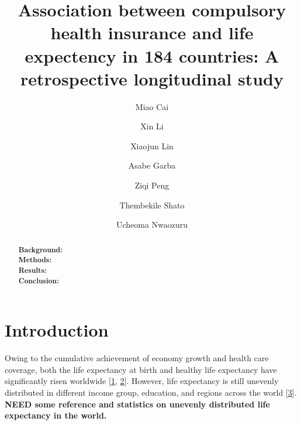 \documentclass[]{elsarticle} %
\begin{document}
\begin{frontmatter}

  \title{Association between compulsory health insurance and life expectency in 184 countries: A retrospective longitudinal study}
    \author[SLU]{Miao Cai}
  
    \author[WHU]{Xin Li}
  
    \author[SCU]{Xiaojun Lin}
    \author[SLU]{Asabe Garba}
  
    \author[SLU]{Ziqi Peng}
  
    \author[SLU]{Thembekile Shato}
  
    \author[SLU]{Ucheoma Nwaozuru}
  
      \address[SLU]{College for Public Health and Social Justice, Saint Louis University, Saint Louis, MO, 63108}
    \address[SCU]{West China School of Public Health, Sichuan University, Chengdu, Sichuan, China, 610044}
    \address[WHU]{School of Information Management, Wuhan University, Wuhan, Hubei, China, 430072}
  
  \begin{abstract}
  \textbf{Background: }\\
  \textbf{Methods: }\\
  \textbf{Results: }\\
  \textbf{Conclusion: }
  \end{abstract}
  
 \end{frontmatter}

\newcommand{\blandscape}{\begin{landscape}}
\newcommand{\elandscape}{\end{landscape}}
\doublespacing

\hypertarget{introduction}{%
\section{Introduction}\label{introduction}}

Owing to the cumulative achievement of economy growth and health care coverage, both the life expectancy at birth and healthy life expectancy have significantly risen worldwide {[}\protect\hyperlink{ref-bor2013increases}{1}, \protect\hyperlink{ref-mathers2015causes}{2}{]}.
However, life expectancy is still unevenly distributed in different income group, education, and regions across the world {[}\protect\hyperlink{ref-world2018global}{3}{]}. \textbf{NEED some reference and statistics on unevenly distributed life expectancy in the world.}
\end{document}
